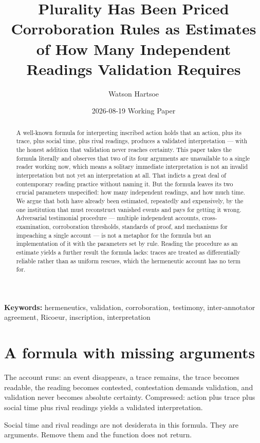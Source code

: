 \documentclass[11pt,a4paper]{article}
\title{\textbf{Plurality Has Been Priced}\\[.35em]\large Corroboration Rules as Estimates of How Many Independent Readings Validation Requires}
\author{Watson Hartsoe}
\date{2026-08-19 \quad\textemdash\quad Working Paper}
\begin{document}
\maketitle
\begin{abstract}\noindent A well-known formula for interpreting inscribed action holds that an action, plus its trace, plus social time, plus rival readings, produces a validated interpretation --- with the honest addition that validation never reaches certainty. This paper takes the formula literally and observes that two of its four arguments are unavailable to a single reader working now, which means a solitary immediate interpretation is not an invalid interpretation but not yet an interpretation at all. That indicts a great deal of contemporary reading practice without naming it. But the formula leaves its two crucial parameters unspecified: how many independent readings, and how much time. We argue that both have already been estimated, repeatedly and expensively, by the one institution that must reconstruct vanished events and pays for getting it wrong. Adversarial testimonial procedure --- multiple independent accounts, cross-examination, corroboration thresholds, standards of proof, and mechanisms for impeaching a single account --- is not a metaphor for the formula but an implementation of it with the parameters set by rule. Reading the procedure as an estimate yields a further result the formula lacks: traces are treated as differentially reliable rather than as uniform rescues, which the hermeneutic account has no term for.\end{abstract}
\vspace{-.5em}\noindent\textbf{Keywords:} hermeneutics, validation, corroboration, testimony, inter-annotator agreement, Ricoeur, inscription, interpretation\par\vspace{1em}
\section{A formula with missing arguments}
The account runs: an event disappears, a trace remains, the trace becomes readable, the reading becomes contested, contestation demands validation, and validation never becomes absolute certainty. Compressed: action plus trace plus social time plus rival readings yields a validated interpretation.

Social time and rival readings are not desiderata in this formula. They are arguments. Remove them and the function does not return.
\end{document}
